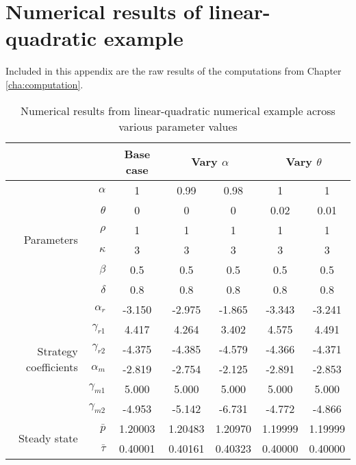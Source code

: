 
\chapter[Numerical results]{Numerical results of linear-quadratic example}
\label{cha:numerical-results}

Included in this appendix are the raw results of the computations from Chapter \ref{cha:computation}.

\begin{sidewaystable}[htbp]
  \centering
  \caption{Numerical results from linear-quadratic numerical example across various parameter values}
    \begin{tabular}{|rr|c|cc|cc|}
    \hline
          &       & \multicolumn{1}{c|}{Base case} & \multicolumn{2}{c|}{Vary $\alpha$}       & \multicolumn{2}{c|}{Vary $\theta$}  \\
    \hline
    \multirow{6}[1]{*}{Parameters} & $\alpha$ & 1     & 0.99  & 0.98  & 1     & 1\\
          & $\theta$ & 0     & 0     & 0     & 0.02  & 0.01 \\
          & $\rho$ & 1     & 1     & 1     & 1     & 1 \\
          & $\kappa$ & 3     & 3     & 3     & 3     & 3 \\
          & $\beta$ & 0.5   & 0.5   & 0.5   & 0.5   & 0.5 \\
          & $\delta$ & 0.8   & 0.8   & 0.8   & 0.8   & 0.8 \\ \hline
    \multirow{6}[0]{*}{Strategy coefficients} & $\alpha_r$ & -3.150 & -2.975 & -1.865 & -3.343 & -3.241 \\
          & $\gamma_{r1}$ & 4.417 & 4.264 & 3.402 & 4.575 & 4.491 \\
          & $\gamma_{r2}$ & -4.375 & -4.385 & -4.579 & -4.366 & -4.371 \\
          & $\alpha_m$ & -2.819 & -2.754 & -2.125 & -2.891 & -2.853 \\
          & $\gamma_{m1}$ & 5.000 & 5.000 & 5.000 & 5.000 & 5.000 \\
          & $\gamma_{m2}$ & -4.953 & -5.142 & -6.731 & -4.772 & -4.866 \\ \hline
    \multirow{2}[1]{*}{Steady state} & $\bar{p}$ & 1.20003 & 1.20483 & 1.20970 & 1.19999 & 1.19999 \\
          & $\bar{\tau}$ & 0.40001 & 0.40161 & 0.40323 & 0.40000 & 0.40000\\
    \hline
    \end{tabular}
\label{tab:numres1}
\end{sidewaystable}

